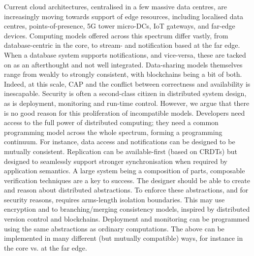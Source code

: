 \documentclass[a4paper,UKenglish]{dagrep-v2018}
\begin{document}

\license

Current cloud architectures, centralised in a few massive data centres, are increasingly moving towards support of edge resources, including localised data centres, points-of-presence, 5G tower micro-DCs, IoT gateways, and far-edge devices. Computing models offered across this spectrum differ vastly, from database-centric in the core, to stream- and notification based at the far edge. When a database system supports notifications, and vice-versa, these are tacked on as an afterthought and not well integrated. Data-sharing models themselves range from weakly to strongly consistent, with blockchains being a bit of both. Indeed, at this scale, CAP and the conflict between correctness and availability is inescapable. Security is often a second-class citizen in distributed system design, as is deployment, monitoring and run-time control. However, we argue that there is no good reason for this proliferation of incompatible models. Developers need access to the full power of distributed computing; they need a common programming model across the whole spectrum, forming a programming continuum. For instance, data access and notifications can be designed to be mutually consistent. Replication can be available-first (based on CRDTs) but designed to seamlessly support stronger synchronisation when required by application semantics. A large system being a composition of parts, composable verification techniques are a key to success. The designer should be able to create and reason about distributed abstractions. To enforce these abstractions, and for security reasons, requires arms-length isolation boundaries. This may use encryption and to branching/merging consistency models, inspired by distributed version control and blockchains. Deployment and monitoring can be programmed using the same abstractions as ordinary computations. The above can be implemented in many different (but mutually compatible) ways, for instance in the core vs. at the far edge.



\license
\end{document}
